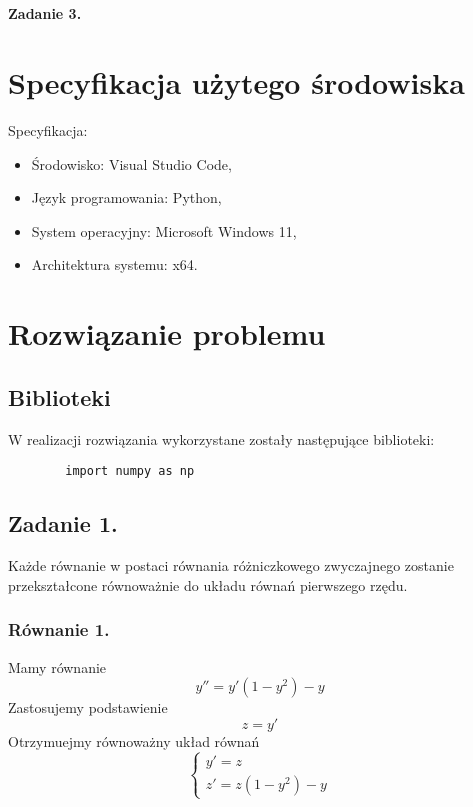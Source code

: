 \documentclass[11pt, leqno]{scrartcl}
\begin{document}
    \subsection*{}
    \textbf{Zadanie 3.}
    

    \section{Specyfikacja użytego środowiska}
    Specyfikacja:
    \begin{itemize}
        \item Środowisko: Visual Studio Code,
        \item Język programowania: Python,
        \item System operacyjny: Microsoft Windows 11,
        \item Architektura systemu: x64.
    \end{itemize}

    \section{Rozwiązanie problemu}
    \subsection{Biblioteki}
    W realizacji rozwiązania wykorzystane zostały następujące
    biblioteki:
    \begin{lstlisting}
        import numpy as np
    \end{lstlisting}

    \subsection{Zadanie 1.}
    Każde równanie w postaci równania różniczkowego zwyczajnego
    zostanie przekształcone równoważnie do układu równań
    pierwszego rzędu.

    \subsubsection{Równanie 1.}
    Mamy równanie
    \[
        y''=y'(1-y^2)-y
    \]
    Zastosujemy podstawienie
    \[
        z=y'
    \]
    Otrzymuejmy równoważny układ równań
    \[
        \begin{cases}
            y'=z \\
            z'=z(1-y^2)-y
        \end{cases}
    \]
\end{document}
